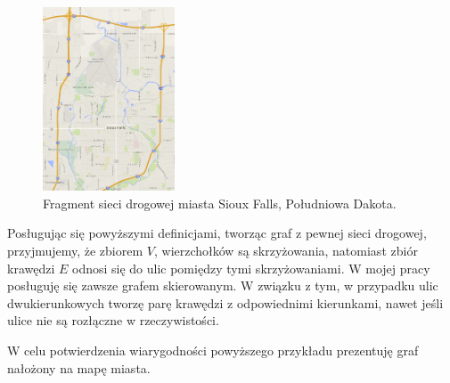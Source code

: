 \documentclass[twoside,12pt]{report}
\begin{document}
\begin{figure}[ht]
\begin{center}
\includegraphics[width=0.35\textwidth]{img/siec}
\caption{Fragment sieci drogowej miasta Sioux Falls, Południowa Dakota.} 
\end{center}
\end{figure}

Posługując się powyższymi definicjami, tworząc graf z pewnej sieci drogowej, przyjmujemy, że zbiorem $V$, wierzchołków są skrzyżowania, natomiast zbiór krawędzi $E$ odnosi się do ulic pomiędzy tymi skrzyżowaniami.
W mojej pracy posługuję się zawsze grafem skierowanym. W związku z tym, w przypadku ulic dwukierunkowych tworzę parę krawędzi z odpowiednimi kierunkami, nawet jeśli ulice nie są rozłączne w rzeczywistości.

W celu potwierdzenia wiarygodności powyższego przykładu prezentuję graf nałożony na mapę miasta\cite{siux}.
\end{document}
